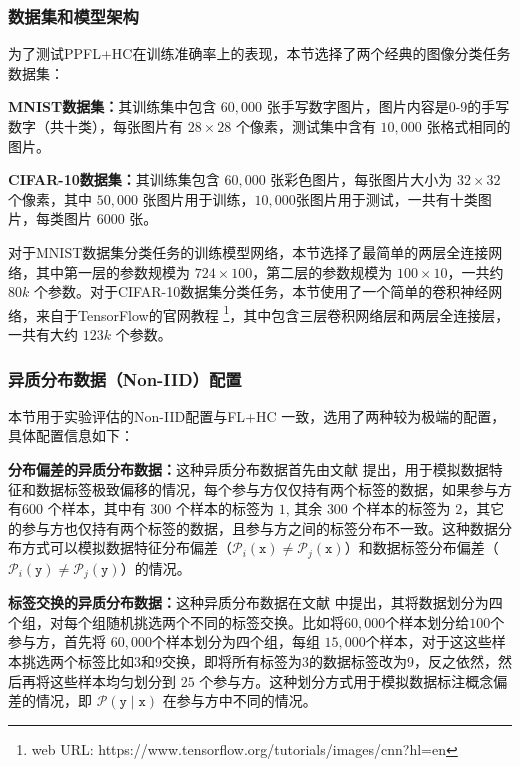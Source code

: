 \subsubsection{数据集和模型架构}
为了测试PPFL+HC在训练准确率上的表现，本节选择了两个经典的图像分类任务数据集：
\begin{compactitem}
	\item \textbf{MNIST数据集：}其训练集中包含 $60,000$ 张手写数字图片，图片内容是0-9的手写数字（共十类），每张图片有 $28 \times28$ 个像素，测试集中含有 $10,000$ 张格式相同的图片。
	\item \textbf{CIFAR-10数据集：}其训练集包含 $60,000$ 张彩色图片，每张图片大小为 $32 \times 32$ 个像素，其中 $50,000$ 张图片用于训练，$10,000$张图片用于测试，一共有十类图片，每类图片 $6000$ 张。
\end{compactitem}
对于MNIST数据集分类任务的训练模型网络，本节选择了最简单的两层全连接网络，其中第一层的参数规模为 $724 \times 100$，第二层的参数规模为 $100 \times 10$，一共约 $80k$ 个参数。对于CIFAR-10数据集分类任务，本节使用了一个简单的卷积神经网络，来自于TensorFlow的官网教程 \footnote{web URL: https://www.tensorflow.org/tutorials/images/cnn?hl=en}，其中包含三层卷积网络层和两层全连接层，一共有大约 $123k$ 个参数。

\subsubsection{异质分布数据（Non-IID）配置}
本节用于实验评估的Non-IID配置与FL+HC \cite{briggs2020federated} 一致，选用了两种较为极端的配置，具体配置信息如下：
\begin{compactenum}
	\item \textbf{分布偏差的异质分布数据：}这种异质分布数据首先由文献 \cite{mcmahan2017communication} 提出，用于模拟数据特征和数据标签极致偏移的情况，每个参与方仅仅持有两个标签的数据，如果参与方有$600$ 个样本，其中有 $300$ 个样本的标签为 $1$, 其余 $300$ 个样本的标签为 $2$，其它的参与方也仅持有两个标签的数据，且参与方之间的标签分布不一致。这种数据分布方式可以模拟数据特征分布偏差（$\mathcal{P}_i(\mathtt{x}) \neq \mathcal{P}_j(\mathtt{x})$）和数据标签分布偏差（$\mathcal{P}_i(\mathtt{y}) \neq \mathcal{P}_j(\mathtt{y})$）的情况。
	\item \textbf{标签交换的异质分布数据：}这种异质分布数据在文献 \cite{sattler2020clustered} 中提出，其将数据划分为四个组，对每个组随机挑选两个不同的标签交换。比如将$60,000$个样本划分给$100$个参与方，首先将 $60,000$个样本划分为四个组，每组 $15,000$个样本，对于这这些样本挑选两个标签比如3和9交换，即将所有标签为3的数据标签改为9，反之依然，然后再将这些样本均匀划分到 $25$ 个参与方。这种划分方式用于模拟数据标注概念偏差的情况，即 $\mathcal{P}(\mathtt{y} \mid \mathtt{x})$ 在参与方中不同的情况。
\end{compactenum}


